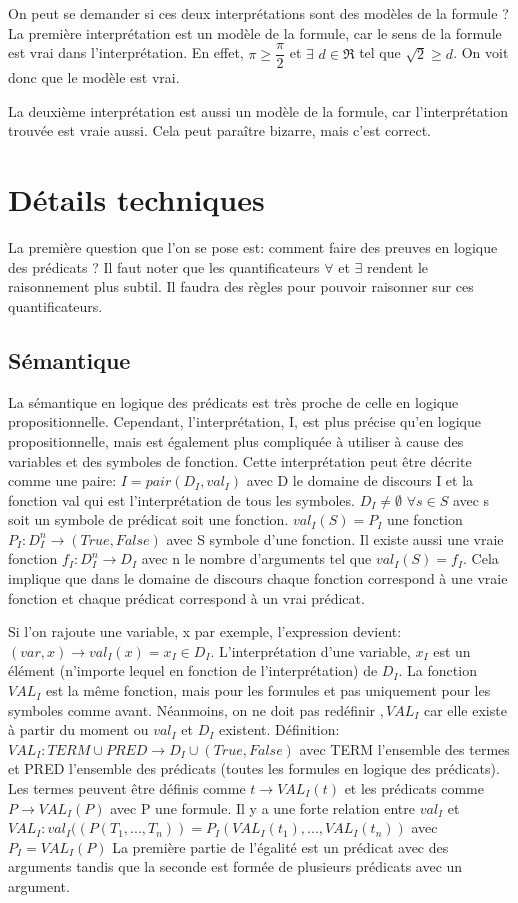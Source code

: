 On peut se demander si ces deux interprétations sont des modèles de la formule ? \\
La première interprétation est un modèle de la formule, car le sens de la formule est vrai dans l'interprétation. En effet, $\pi \geq \dfrac{\pi}{2}$ et $\exists$ $ d \in \Re$ tel que $\sqrt2 \geq d$. On voit donc que le modèle est vrai.

La deuxième interprétation est aussi un modèle de la formule, car l'interprétation trouvée est vraie aussi. Cela peut paraître bizarre, mais c'est correct. 
\section{Détails techniques}
La première question que l'on se pose est: comment faire des preuves en logique des prédicats ? Il faut noter que les quantificateurs $\forall$ et $\exists$ rendent le raisonnement plus subtil. Il faudra des règles pour pouvoir raisonner sur ces quantificateurs.
\subsection{Sémantique}
La sémantique en logique des prédicats est très proche de celle en logique propositionnelle. Cependant, l'interprétation, I, est plus précise qu'en logique propositionnelle, mais est également plus compliquée à utiliser à cause des variables et des symboles de fonction. Cette interprétation peut être décrite comme une paire: $I = pair(D_{I}, val_{I}) $ avec D le domaine de discours I et la fonction val qui est l'interprétation de tous les symboles. $D_{I} \ne \emptyset $ $ \forall s \in S$ avec s soit un symbole de prédicat soit une fonction. $val_{I}(S) = P_{I}$ une fonction $P_{I}:D_{I}^{n} \rightarrow (True,False)$ avec S symbole d'une fonction. Il existe aussi une vraie fonction $f_{I}:D_{I}^{n} \rightarrow D_{I}$ avec n le nombre d'arguments tel que $val_{I}(S) = f_{I} $. Cela implique que dans le domaine de discours chaque fonction correspond à une vraie fonction et chaque prédicat correspond à un vrai prédicat. 


Si l'on rajoute une variable, x par exemple, l'expression devient: $ (var, x) \rightarrow val_{I}(x) = x_{I} \in D_{I}$. L'interprétation d'une variable, $x_{I}$ est un élément (n'importe lequel en fonction de l'interprétation) de $D_{I}$. La fonction $VAL_{I}$ est la même fonction, mais pour les formules et pas uniquement pour les symboles comme avant. Néanmoins, on ne doit pas redéfinir $,VAL_{I}$ car elle existe à partir du moment ou $val_{I}$ et $D_{I}$ existent. Définition: $VAL_{I}: TERM \cup  PRED \rightarrow D_{I} \cup (True, False) $ avec TERM l'ensemble des termes et PRED l'ensemble des
prédicats (toutes les formules en logique des prédicats). Les termes peuvent être définis comme $ t \rightarrow VAL_{I}(t)$ et les prédicats comme $ P \rightarrow VAL_{I}(P)$ avec P une formule. Il y a une forte relation entre $val_{I} $ et $VAL_{I}: val_{I}((P(T_{1},...,T_{n})) = P_{I}(VAL_{I}(t_{1}),...,VAL_{I}(t_{n}))$ avec $ P_{I} = VAL_{I}(P)$ 
La première partie de l'égalité est un prédicat avec des arguments tandis que la seconde est formée de plusieurs prédicats avec un argument. 


